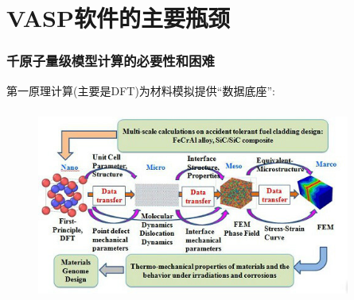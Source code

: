 \section{\rm{VASP}软件的主要瓶颈}
\begin{frame}
	\frametitle{千原子量级模型计算的必要性和困难}
	第一原理计算(主要是\textrm{DFT})为材料模拟提供``数据底座'':
\begin{figure}[h!]
\vspace*{-0.10in}
\includegraphics[height=2.50in,width=4.05in]{Figures/Multi_Scale-5.jpg}
\label{Multi-Scale-2}
\end{figure}
\end{frame}

